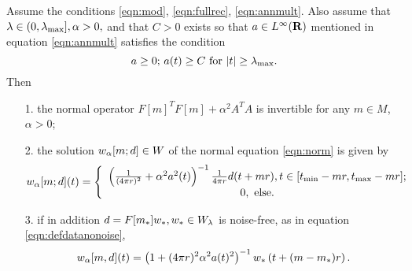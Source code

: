 \begin{proposition}
  \label{thm:norminvexp}
  Assume the conditions \ref{eqn:mod}, \ref{eqn:fullrec},
  \ref{eqn:annmult}. Also assume that $\lambda \in (0,\lambda_{\rm
    max}], \alpha > 0,$ and that  $C>0$ exists so that $a \in L^{\infty}({\bf R})$
  mentioned in equation \ref{eqn:annmult} satisfies the condition
  \begin{equation}
    \label{eqn:abnd} 
    a \ge 0; \, a(t) \ge C\mbox{ for }|t| \ge \lambda_{\rm max}.
  \end{equation}
  Then
  \begin{itemize}
  \item[1. ]the normal operator $F[m]^TF[m] + \alpha^2A^TA$ is
    invertible for any $m \in M$, $\alpha > 0$;
  \item[2. ]the solution $w_{\alpha}[m;d]\in W$ of the normal equation
    \ref{eqn:norm} is given by
    \begin{equation}
      \label{eqn:normsol}
      w_{\alpha}[m;d](t) = \left\{
        \begin{array}{c}
          \left(\frac{1}{(4\pi r)^2} + \alpha^2
          a^2(t)\right)^{-1}\frac{1}{4 \pi r}d(t+mr), t \in [t_{\rm
          min}-mr, t_{\rm max}-mr];\\
          0, \mbox{ else.}
        \end{array}
      \right.
    \end{equation}
  \item[3. ]if in addition $d=F[m_*]w_*, w_* \in W_{\lambda}$ is noise-free, as in equation
    \ref{eqn:defdatanonoise},
    \begin{equation}
      \label{eqn:solnonoise}
      w_{\alpha}[m,d](t)= \left(1+ (4\pi r)^2\alpha^2 a(t)^2\right)^{-1}w_*\left(t+(m-m_*)r\right).
    \end{equation}
  \end{itemize}
\end{proposition}

